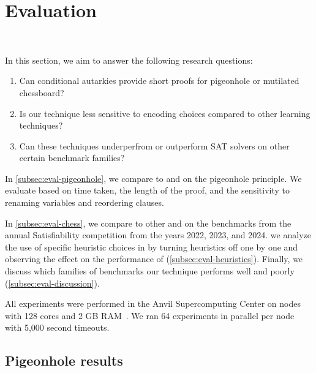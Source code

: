 \section{Evaluation}~\label{sec:evaluation}

In this section, we aim to answer the following research questions:


\begin{enumerate}
    \item Can conditional autarkies provide short \pr proofs for pigeonhole or mutilated chessboard?
    \item Is our technique less sensitive to encoding choices compared to other
    \pr learning techniques?
    \item Can these techniques underperfrom or outperform SAT solvers on other certain benchmark
    families?
\end{enumerate}


In \autoref{subsec:eval-pigeonhole}, we compare \tool to \cadical and \sadical
on the pigeonhole principle. We evaluate based on time taken, the length of
the proof, and the sensitivity to renaming variables and reordering clauses. 


In \autoref{subsec:eval-chess}, we compare \tool to other \cadical and \prelearn
on the benchmarks from the annual Satisfiability competition from the years
2022, 2023, and 2024. we analyze the use of specific heuristic choices in \tool by turning
heuristics off one by one and observing the effect on the performance of \tool (\autoref{subsec:eval-heuristics}). Finally, we discuss which families
of benchmarks our technique performs well and poorly (\autoref{subsec:eval-discussion}).

All experiments were performed in the Anvil Supercomputing Center on nodes
with 128 cores and 2 GB RAM~\cite{anvil}. We ran 64 experiments in parallel per node with 5,000 second timeouts.

\subsection{Pigeonhole results}~\label{subsec:eval-pigeonhole}

